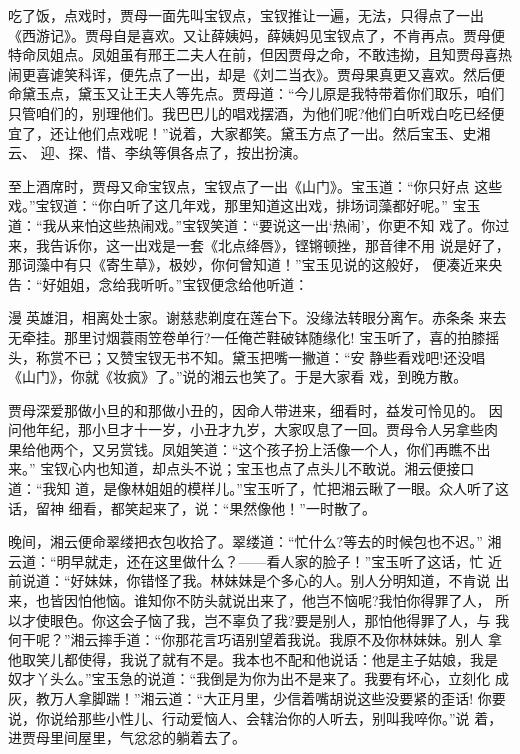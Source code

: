 吃了饭，点戏时，贾母一面先叫宝钗点，宝钗推让一遍，无法，只得点了一出
《西游记》。贾母自是喜欢。又让薛姨妈，薛姨妈见宝钗点了，不肯再点。贾母便
特命凤姐点。凤姐虽有邢王二夫人在前，但因贾母之命，不敢违拗，且知贾母喜热
闹更喜谑笑科诨，便先点了一出，却是《刘二当衣》。贾母果真更又喜欢。然后便
命黛玉点，黛玉又让王夫人等先点。贾母道：“今儿原是我特带着你们取乐，咱们
只管咱们的，别理他们。我巴巴儿的唱戏摆酒，为他们呢?他们白听戏白吃已经便
宜了，还让他们点戏呢！”说着，大家都笑。黛玉方点了一出。然后宝玉、史湘云、
迎、探、惜、李纨等俱各点了，按出扮演。

至上酒席时，贾母又命宝钗点，宝钗点了一出《山门》。宝玉道：“你只好点
这些戏。”宝钗道：“你白听了这几年戏，那里知道这出戏，排场词藻都好呢。”
宝玉道：“我从来怕这些热闹戏。”宝钗笑道：“要说这一出‘热闹’，你更不知
戏了。你过来，我告诉你，这一出戏是一套《北点绛唇》，铿锵顿挫，那音律不用
说是好了，那词藻中有只《寄生草》，极妙，你何曾知道！”宝玉见说的这般好，
便凑近来央告：“好姐姐，念给我听听。”宝钗便念给他听道：

漫英雄泪，相离处士家。谢慈悲剃度在莲台下。没缘法转眼分离乍。赤条条
来去无牵挂。那里讨烟蓑雨笠卷单行?一任俺芒鞋破钵随缘化!
宝玉听了，喜的拍膝摇头，称赏不已；又赞宝钗无书不知。黛玉把嘴一撇道：“安
静些看戏吧!还没唱《山门》，你就《妆疯》了。”说的湘云也笑了。于是大家看
戏，到晚方散。

贾母深爱那做小旦的和那做小丑的，因命人带进来，细看时，益发可怜见的。
因问他年纪，那小旦才十一岁，小丑才九岁，大家叹息了一回。贾母令人另拿些肉
果给他两个，又另赏钱。凤姐笑道：“这个孩子扮上活像一个人，你们再瞧不出来。”
宝钗心内也知道，却点头不说；宝玉也点了点头儿不敢说。湘云便接口道：“我知
道，是像林姐姐的模样儿。”宝玉听了，忙把湘云瞅了一眼。众人听了这话，留神
细看，都笑起来了，说：“果然像他！”一时散了。

晚间，湘云便命翠缕把衣包收拾了。翠缕道：“忙什么?等去的时候包也不迟。”
湘云道：“明早就走，还在这里做什么？——看人家的脸子！”宝玉听了这话，忙
近前说道：“好妹妹，你错怪了我。林妹妹是个多心的人。别人分明知道，不肯说
出来，也皆因怕他恼。谁知你不防头就说出来了，他岂不恼呢?我怕你得罪了人，
所以才使眼色。你这会子恼了我，岂不辜负了我?要是别人，那怕他得罪了人，与
我何干呢？”湘云摔手道：“你那花言巧语别望着我说。我原不及你林妹妹。别人
拿他取笑儿都使得，我说了就有不是。我本也不配和他说话：他是主子姑娘，我是
奴才丫头么。”宝玉急的说道：“我倒是为你为出不是来了。我要有坏心，立刻化
成灰，教万人拿脚踹！”湘云道：“大正月里，少信着嘴胡说这些没要紧的歪话!
你要说，你说给那些小性儿、行动爱恼人、会辖治你的人听去，别叫我啐你。”说
着，进贾母里间屋里，气忿忿的躺着去了。

